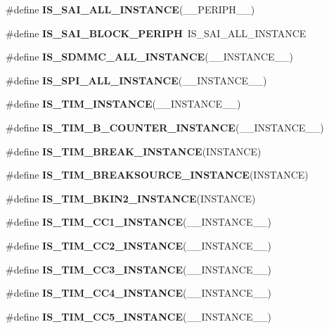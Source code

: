 \begin{DoxyCompactItemize}
\item 
\#define {\bfseries I\+S\+\_\+\+S\+A\+I\+\_\+\+A\+L\+L\+\_\+\+I\+N\+S\+T\+A\+N\+CE}(\+\_\+\+\_\+\+P\+E\+R\+I\+P\+H\+\_\+\+\_\+)
\item 
\mbox{\label{group___exported__macros_gae9459b2e443c3f8139809cca5e15ad09}} 
\#define {\bfseries I\+S\+\_\+\+S\+A\+I\+\_\+\+B\+L\+O\+C\+K\+\_\+\+P\+E\+R\+I\+PH}~I\+S\+\_\+\+S\+A\+I\+\_\+\+A\+L\+L\+\_\+\+I\+N\+S\+T\+A\+N\+CE
\item 
\#define {\bfseries I\+S\+\_\+\+S\+D\+M\+M\+C\+\_\+\+A\+L\+L\+\_\+\+I\+N\+S\+T\+A\+N\+CE}(\+\_\+\+\_\+\+I\+N\+S\+T\+A\+N\+C\+E\+\_\+\+\_\+)
\item 
\#define {\bfseries I\+S\+\_\+\+S\+P\+I\+\_\+\+A\+L\+L\+\_\+\+I\+N\+S\+T\+A\+N\+CE}(\+\_\+\+\_\+\+I\+N\+S\+T\+A\+N\+C\+E\+\_\+\+\_\+)
\item 
\#define {\bfseries I\+S\+\_\+\+T\+I\+M\+\_\+\+I\+N\+S\+T\+A\+N\+CE}(\+\_\+\+\_\+\+I\+N\+S\+T\+A\+N\+C\+E\+\_\+\+\_\+)
\item 
\#define {\bfseries I\+S\+\_\+\+T\+I\+M\+\_\+B\+\_\+\+C\+O\+U\+N\+T\+E\+R\+\_\+\+I\+N\+S\+T\+A\+N\+CE}(\+\_\+\+\_\+\+I\+N\+S\+T\+A\+N\+C\+E\+\_\+\+\_\+)
\item 
\#define {\bfseries I\+S\+\_\+\+T\+I\+M\+\_\+\+B\+R\+E\+A\+K\+\_\+\+I\+N\+S\+T\+A\+N\+CE}(I\+N\+S\+T\+A\+N\+CE)
\item 
\#define {\bfseries I\+S\+\_\+\+T\+I\+M\+\_\+\+B\+R\+E\+A\+K\+S\+O\+U\+R\+C\+E\+\_\+\+I\+N\+S\+T\+A\+N\+CE}(I\+N\+S\+T\+A\+N\+CE)
\item 
\#define {\bfseries I\+S\+\_\+\+T\+I\+M\+\_\+\+B\+K\+I\+N2\+\_\+\+I\+N\+S\+T\+A\+N\+CE}(I\+N\+S\+T\+A\+N\+CE)
\item 
\#define {\bfseries I\+S\+\_\+\+T\+I\+M\+\_\+\+C\+C1\+\_\+\+I\+N\+S\+T\+A\+N\+CE}(\+\_\+\+\_\+\+I\+N\+S\+T\+A\+N\+C\+E\+\_\+\+\_\+)
\item 
\#define {\bfseries I\+S\+\_\+\+T\+I\+M\+\_\+\+C\+C2\+\_\+\+I\+N\+S\+T\+A\+N\+CE}(\+\_\+\+\_\+\+I\+N\+S\+T\+A\+N\+C\+E\+\_\+\+\_\+)
\item 
\#define {\bfseries I\+S\+\_\+\+T\+I\+M\+\_\+\+C\+C3\+\_\+\+I\+N\+S\+T\+A\+N\+CE}(\+\_\+\+\_\+\+I\+N\+S\+T\+A\+N\+C\+E\+\_\+\+\_\+)
\item 
\#define {\bfseries I\+S\+\_\+\+T\+I\+M\+\_\+\+C\+C4\+\_\+\+I\+N\+S\+T\+A\+N\+CE}(\+\_\+\+\_\+\+I\+N\+S\+T\+A\+N\+C\+E\+\_\+\+\_\+)
\item 
\#define {\bfseries I\+S\+\_\+\+T\+I\+M\+\_\+\+C\+C5\+\_\+\+I\+N\+S\+T\+A\+N\+CE}(\+\_\+\+\_\+\+I\+N\+S\+T\+A\+N\+C\+E\+\_\+\+\_\+)

\end{DoxyCompactItemize}
